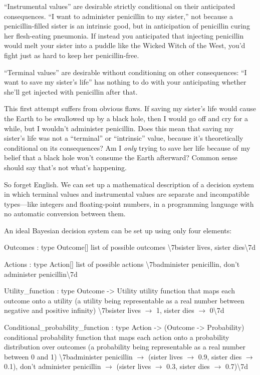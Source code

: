{
 ``Instrumental values'' are
desirable strictly conditional on their anticipated consequences.
``I want to administer penicillin to my
sister,'' not because a penicillin-filled sister is
an intrinsic good, but in anticipation of penicillin curing her
flesh-eating pneumonia. If instead you anticipated that injecting
penicillin would melt your sister into a puddle like the Wicked Witch
of the West, you'd fight just as hard to keep her
penicillin-free.}

{
 ``Terminal values'' are
desirable without conditioning on other consequences:
``I want to save my sister's
life'' has nothing to do with your anticipating
whether she'll get injected with penicillin after
that.}

{
 This first attempt suffers from obvious flaws. If saving my
sister's life would cause the Earth to be swallowed up
by a black hole, then I would go off and cry for a while, but I
wouldn't administer penicillin. Does this mean that
saving my sister's life was not a
``terminal'' or
``intrinsic'' value, because
it's theoretically conditional on its consequences? Am
I \textit{only} trying to save her life because of my belief that a
black hole won't consume the Earth afterward? Common
sense should say that's not what's
happening.}

{
 So forget English. We can set up a mathematical description of a
decision system in which terminal values and instrumental values are
separate and incompatible types---like integers and floating-point
numbers, in a programming language with no automatic conversion between
them.}

{
 An ideal Bayesian decision system can be set up using only four
elements:}

{
  Outcomes : type Outcome[] list of possible outcomes
{\textbackslash}{\textquotesingle}7bsister lives, sister
dies{\textbackslash}{\textquotesingle}7d }

{
  Actions : type Action[] list of possible actions
{\textbackslash}{\textquotesingle}7badminister penicillin,
don't administer
penicillin{\textbackslash}{\textquotesingle}7d }

{
  Utility\_function : type Outcome -{\textgreater} Utility utility
function that maps each outcome onto a utility (a utility being
representable as a real number between negative and positive infinity)
{\textbackslash}{\textquotesingle}7bsister lives $\rightarrow $ 1,
sister dies $\rightarrow $ 0{\textbackslash}{\textquotesingle}7d }

{
  Conditional\_probability\_function :\newline
 type Action -{\textgreater} (Outcome -{\textgreater} Probability)
conditional probability function that maps each action onto a
probability distribution over outcomes (a probability being
representable as a real number between 0 and 1)
{\textbackslash}{\textquotesingle}7badminister penicillin $\rightarrow
$ (sister lives $\rightarrow $ 0.9, sister dies $\rightarrow $ 0.1),
don't administer penicillin $\rightarrow $ (sister
lives $\rightarrow $ 0.3, sister dies $\rightarrow $
0.7){\textbackslash}{\textquotesingle}7d }


